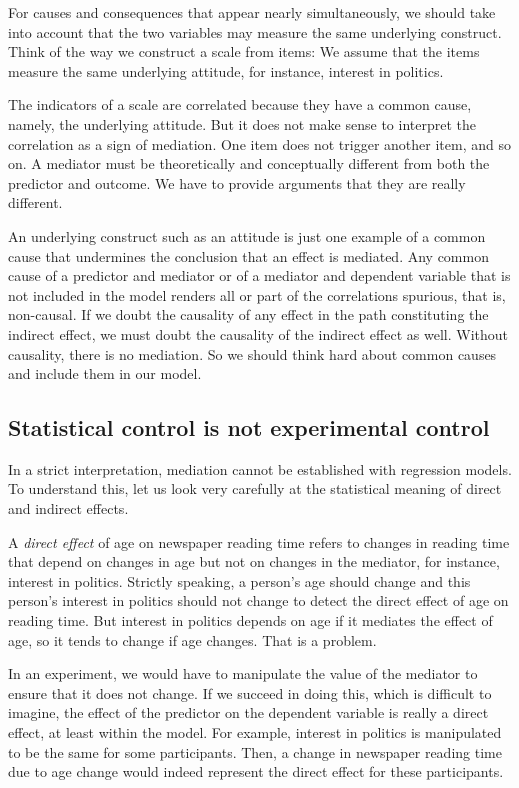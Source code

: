 \documentclass[a4paper]{book}
\theoremstyle{definition}
\theoremstyle{definition}
\theoremstyle{definition}
\theoremstyle{remark}
\begin{document}
For causes and consequences that appear nearly simultaneously, we should
take into account that the two variables may measure the same underlying
construct. Think of the way we construct a scale from items: We assume
that the items measure the same underlying attitude, for instance,
interest in politics.

The indicators of a scale are correlated because they have a common
cause, namely, the underlying attitude. But it does not make sense to
interpret the correlation as a sign of mediation. One item does not
trigger another item, and so on. A mediator must be theoretically and
conceptually different from both the predictor and outcome. We have to
provide arguments that they are really different.

An underlying construct such as an attitude is just one example of a
common cause that undermines the conclusion that an effect is mediated.
Any common cause of a predictor and mediator or of a mediator and
dependent variable that is not included in the model renders all or part
of the correlations spurious, that is, non-causal. If we doubt the
causality of any effect in the path constituting the indirect effect, we
must doubt the causality of the indirect effect as well. Without
causality, there is no mediation. So we should think hard about common
causes and include them in our model.

\subsection{Statistical control is not experimental
control}\label{statistical-control-is-not-experimental-control}

In a strict interpretation, mediation cannot be established with
regression models. To understand this, let us look very carefully at the
statistical meaning of direct and indirect effects.

A \emph{direct effect} of age on newspaper reading time refers to
changes in reading time that depend on changes in age but not on changes
in the mediator, for instance, interest in politics. Strictly speaking,
a person's age should change and this person's interest in politics
should not change to detect the direct effect of age on reading time.
But interest in politics depends on age if it mediates the effect of
age, so it tends to change if age changes. That is a problem.

In an experiment, we would have to manipulate the value of the mediator
to ensure that it does not change. If we succeed in doing this, which is
difficult to imagine, the effect of the predictor on the dependent
variable is really a direct effect, at least within the model. For
example, interest in politics is manipulated to be the same for some
participants. Then, a change in newspaper reading time due to age change
would indeed represent the direct effect for these participants.
\end{document}
